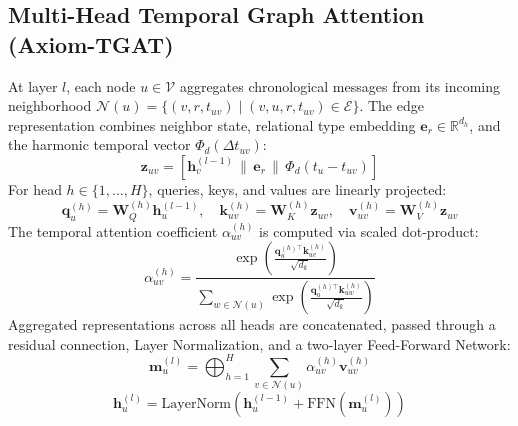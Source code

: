 \documentclass[11pt,a4paper]{article}
\begin{document}
\subsection{Multi-Head Temporal Graph Attention (Axiom-TGAT)}
At layer $l$, each node $u \in \mathcal{V}$ aggregates chronological messages from its incoming neighborhood $\mathcal{N}(u) = \{ (v, r, t_{uv}) \mid (v, u, r, t_{uv}) \in \mathcal{E} \}$. The edge representation combines neighbor state, relational type embedding $\mathbf{e}_r \in \mathbb{R}^{d_h}$, and the harmonic temporal vector $\Phi_d(\Delta t_{uv})$:
\begin{equation}
\mathbf{z}_{uv} = \left[ \mathbf{h}_v^{(l-1)} \,\|\, \mathbf{e}_r \,\|\, \Phi_d(t_u - t_{uv}) \right]
\end{equation}
For head $h \in \{1, \dots, H\}$, queries, keys, and values are linearly projected:
\begin{equation}
\mathbf{q}_u^{(h)} = \mathbf{W}_Q^{(h)} \mathbf{h}_u^{(l-1)}, \quad \mathbf{k}_{uv}^{(h)} = \mathbf{W}_K^{(h)} \mathbf{z}_{uv}, \quad \mathbf{v}_{uv}^{(h)} = \mathbf{W}_V^{(h)} \mathbf{z}_{uv}
\end{equation}
The temporal attention coefficient $\alpha_{uv}^{(h)}$ is computed via scaled dot-product:
\begin{equation}
\alpha_{uv}^{(h)} = \frac{\exp\left( \frac{\mathbf{q}_u^{(h)\top} \mathbf{k}_{uv}^{(h)}}{\sqrt{d_k}} \right)}{\sum_{w \in \mathcal{N}(u)} \exp\left( \frac{\mathbf{q}_u^{(h)\top} \mathbf{k}_{uw}^{(h)}}{\sqrt{d_k}} \right)}
\end{equation}
Aggregated representations across all heads are concatenated, passed through a residual connection, Layer Normalization, and a two-layer Feed-Forward Network:
\begin{equation}
\mathbf{m}_u^{(l)} = \bigoplus_{h=1}^H \sum_{v \in \mathcal{N}(u)} \alpha_{uv}^{(h)} \mathbf{v}_{uv}^{(h)}
\end{equation}
\begin{equation}
\mathbf{h}_u^{(l)} = \text{LayerNorm}\left( \mathbf{h}_u^{(l-1)} + \text{FFN}(\mathbf{m}_u^{(l)}) \right)
\end{equation}
\end{document}
